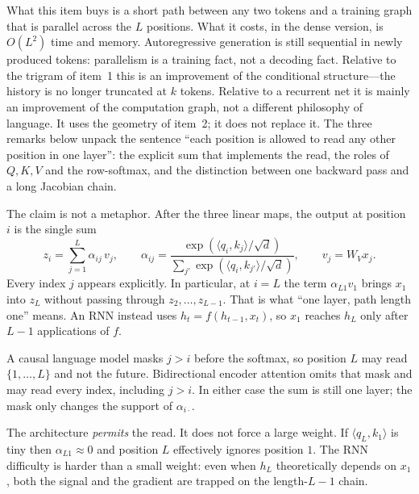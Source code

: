 \documentclass[11pt,a4paper]{article}
\theoremstyle{definition}
\begin{document}
What this item buys is a short path between any two tokens and a training graph that is parallel across the \(L\) positions. What it costs, in the dense version, is \(O(L^2)\) time and memory. Autoregressive generation is still sequential in newly produced tokens: parallelism is a training fact, not a decoding fact. Relative to the trigram of item~1 this is an improvement of the conditional structure---the history is no longer truncated at \(k\) tokens. Relative to a recurrent net it is mainly an improvement of the computation graph, not a different philosophy of language. It uses the geometry of item~2; it does not replace it. The three remarks below unpack the sentence ``each position is allowed to read any other position in one layer'': the explicit sum that implements the read, the roles of \(Q,K,V\) and the row-softmax, and the distinction between one backward pass and a long Jacobian chain.

\begin{remark}\label{rem:spr2025-nlp-attn-read}
The claim is not a metaphor. After the three linear maps, the output at position \(i\) is the single sum
\[
z_i
=\sum_{j=1}^{L}
\alpha_{ij}\,v_j,
\qquad
\alpha_{ij}
=\frac{\exp(\langle q_i,k_j\rangle/\sqrt{d})}
{\sum_{j'}\exp(\langle q_i,k_{j'}\rangle/\sqrt{d})},
\qquad
v_j=W_V x_j.
\]
Every index \(j\) appears explicitly. In particular, at \(i=L\) the term \(\alpha_{L1}v_1\) brings \(x_1\) into \(z_L\) without passing through \(z_2,\ldots,z_{L-1}\). That is what ``one layer, path length one'' means. An RNN instead uses \(h_t=f(h_{t-1},x_t)\), so \(x_1\) reaches \(h_L\) only after \(L-1\) applications of \(f\).

A causal language model masks \(j>i\) before the softmax, so position \(L\) may read \(\{1,\ldots,L\}\) and not the future. Bidirectional encoder attention omits that mask and may read every index, including \(j>i\). In either case the sum is still one layer; the mask only changes the support of \(\alpha_{i\cdot}\).

The architecture \emph{permits} the read. It does not force a large weight. If \(\langle q_L,k_1\rangle\) is tiny then \(\alpha_{L1}\approx 0\) and position \(L\) effectively ignores position \(1\). The RNN difficulty is harder than a small weight: even when \(h_L\) theoretically depends on \(x_1\), both the signal and the gradient are trapped on the length-\(L-1\) chain.
\end{remark}
\end{document}
